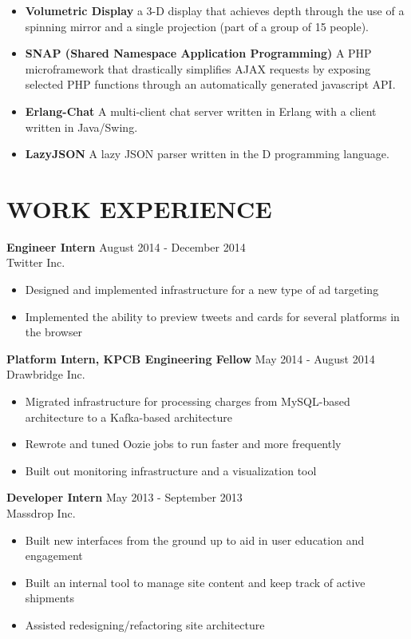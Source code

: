 \documentclass[line,margin]{res}
\begin{document}
\begin{resume}
\begin{itemize}
\item {\bf Volumetric Display} a 3-D display that achieves depth through the
   use of a spinning mirror and a single projection
   (part of a group of 15 people).

\item {\bf SNAP (Shared Namespace Application Programming)}
   A PHP microframework that drastically simplifies AJAX requests by
   exposing selected PHP functions through an automatically generated
   javascript API.


\item {\bf Erlang-Chat}   A multi-client chat server written in Erlang with a
   client written in Java/Swing.



\item {\bf LazyJSON}  A lazy JSON parser written in the D programming language.


\end{itemize}

\section{WORK EXPERIENCE}

{\bf Engineer Intern} \hfill August 2014 - December 2014 \\
  Twitter Inc.
  \begin{itemize}
  \item Designed and implemented infrastructure for a new type of ad targeting
  \item Implemented the ability to preview tweets and cards for several platforms in the browser
  \end{itemize}

{\bf Platform Intern, KPCB Engineering Fellow} \hfill May 2014 - August 2014 \\
    Drawbridge Inc.

    \begin{itemize}
    \item Migrated infrastructure for processing charges from MySQL-based architecture
    to a Kafka-based architecture
    \item Rewrote and tuned Oozie jobs to run faster and more frequently
    \item Built out monitoring infrastructure and a visualization tool
    \end{itemize}

{\bf Developer Intern} \hfill May 2013 - September 2013\\
    Massdrop Inc.
    \begin{itemize}
    \item Built new interfaces from the ground up to aid in user education and engagement
    \item Built an internal tool to manage site content and keep track of active shipments
    \item Assisted redesigning/refactoring site architecture
    \end{itemize}


\end{resume}
\end{document}
